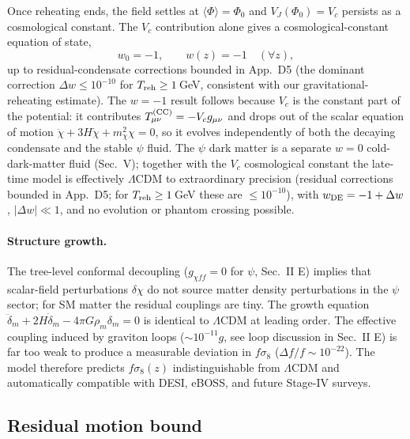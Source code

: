\documentclass[pdflatex,sn-mathphys-num]{sn-jnl}
\newcommand{\PhiV}{\Phi_0}
\newcommand{\vev}[1]{\langle #1\rangle}
\theoremstyle{thmstyleone}
\begin{document}
Once reheating ends, the field settles at $\vev{\Phi}=\PhiV$ and $V_J(\PhiV)=V_c$ persists as a cosmological constant. The $V_c$ contribution alone gives a cosmological-constant equation of state,
\begin{equation}
w_0=-1,\qquad w(z)=-1\quad(\forall z),
\label{eq:w0}
\end{equation}
up to residual-condensate corrections bounded in App.~D5 (the dominant correction $\Delta w\leq10^{-10}$ for $T_{\rm reh}\geq1\,$GeV, consistent with our gravitational-reheating estimate). The $w=-1$ result follows because $V_c$ is the constant part of the potential: it contributes $T^{({\rm CC})}_{\mu\nu}=-V_c g_{\mu\nu}$ and drops out of the scalar equation of motion $\ddot\chi+3H\dot\chi+m_\chi^2\chi=0$, so it evolves independently of both the decaying condensate and the stable $\psi$ fluid. The $\psi$ dark matter is a separate $w=0$ cold-dark-matter fluid (Sec.~V); together with the $V_c$ cosmological constant the late-time model is effectively $\Lambda$CDM to extraordinary precision (residual corrections bounded in App.~D5; for $T_{\rm reh}\geq1\,$GeV these are $\leq10^{-10}$), with $w_{\rm DE}=-1+\Delta w$, $|\Delta w|\ll1$, and no evolution or phantom crossing possible.

\paragraph{Structure growth.} The tree-level conformal decoupling ($g_{\chi ff}=0$ for $\psi$, Sec.~II E) implies that scalar-field perturbations $\delta\chi$ do not source matter density perturbations in the $\psi$ sector; for SM matter the residual couplings are tiny. The growth equation $\ddot\delta_m+2H\dot\delta_m-4\pi G\rho_m\delta_m=0$ is identical to $\Lambda$CDM at leading order. The effective coupling induced by graviton loops ($\sim10^{-11}g$, see loop discussion in Sec.~II E) is far too weak to produce a measurable deviation in $f\sigma_8$ ($\Delta f/f\sim10^{-22}$). The model therefore predicts $f\sigma_8(z)$ indistinguishable from $\Lambda$CDM and automatically compatible with DESI, eBOSS, and future Stage-IV surveys.

\subsection{Residual motion bound}
\end{document}
